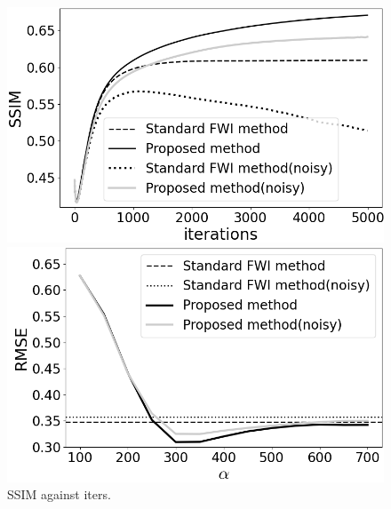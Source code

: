 \begin{figure}[htbp]
    \centering
    \hspace{-3mm}
    \begin{minipage}{58mm}
        \centering
        \includegraphics[width=\linewidth]{public/iters-ssim-all}
        \caption{SSIM against iters.}
        \label{fig:iters-ssim-noisy}
        \vspace{-5mm}
    \end{minipage}
    \hspace{-1mm}
    \begin{minipage}{58mm}
        \centering
        \includegraphics[width=\linewidth]{public/alpha-rmse}

\end{minipage}
\end{figure}
